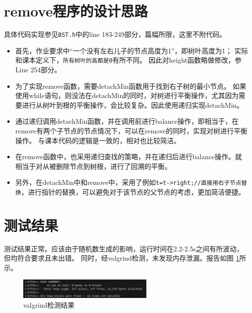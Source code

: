 \documentclass[UTF8]{ctexart}
\begin{document}
\pagestyle{fancy}
\fancyhead{}

\section{remove程序的设计思路}

具体代码实现参见\texttt{BST.h}中的line 183-249部分，篇幅所限，这里不附代码。

\begin{itemize}
    \item 首先，作业要求中“⼀个没有左右⼉⼦的节点⾼度为1”，即树叶高度为1；
    实际和课本定义下，\texttt{所有树叶的高都是0}有所不同。
    因此对height函数略做修改，参Line 254部分。
    \item 为了实现remove函数，需要detachMin函数用于找到右子树的最小节点。
    如果使用while语句，则没法在detachMin的同时，对树进行平衡操作，尤其因为需要进行从树叶到根的平衡操作，会比较复杂。因此使用递归实现detachMin。
    \item 通过递归调用detachMin函数，并在调用前进行balance操作，即相当于，在remove有两个子节点的节点情况下，可以在remove的同时，实现对树进行平衡操作。
    与课本代码的逻辑是一致的，相对也比较简洁。
    \item 在remove函数中，也采用递归查找的策略，并在递归后进行balance操作。就相当于对从被删除节点到树根，进行了回溯的平衡。
    \item 另外，在detachMin中和remove中，采用了例如\verb|t=t->right;//直接用右子节点替换|，进行指针的替换，可以避免对于该节点的父节点的考虑，更加简洁便捷。
\end{itemize}

\section{测试结果}

测试结果正常。应该由于随机数生成的影响，运行时间在2.2-2.5s之间有所波动，但均符合要求且未出错。
同时，经valgrind检测，未发现内存泄漏。报告如图 \ref{fig:valgrind}所示。
\begin{figure}[H]
    \centering
    \includegraphics[width=0.6\textwidth]{valgrind.png}
    \caption{valgrind检测结果}
    \label{fig:valgrind}
\end{figure}
\end{document}

